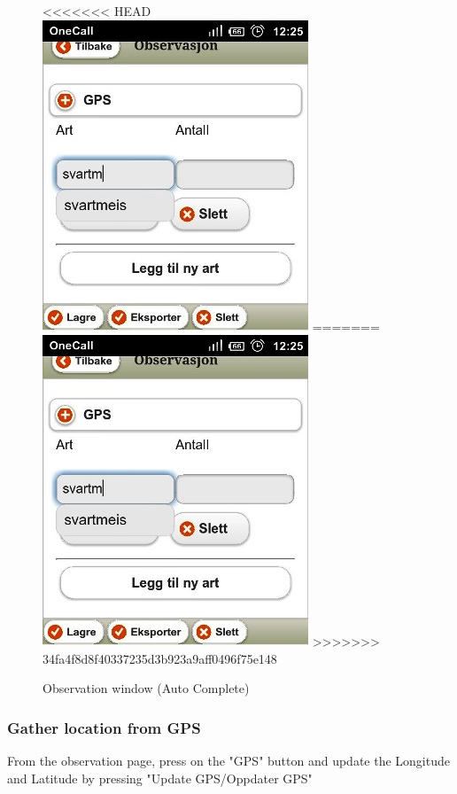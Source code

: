 \begin{figure}[h!]
\centering
<<<<<<< HEAD
 \includegraphics[scale=0.7]{appendix/pic/auto.jpg}
=======
 \includegraphics[height=0.6\textwidth]{appendix/pic/auto.jpg} 
>>>>>>> 34fa4f8d8f40337235d3b923a9aff0496f75e148
 \caption{Observation window (Auto Complete)}
 \end{figure}



\pagebreak
\subsubsection{Gather location from GPS}
From the observation page, press on the "GPS" button and update the Longitude and Latitude by pressing "Update GPS/Oppdater GPS"

